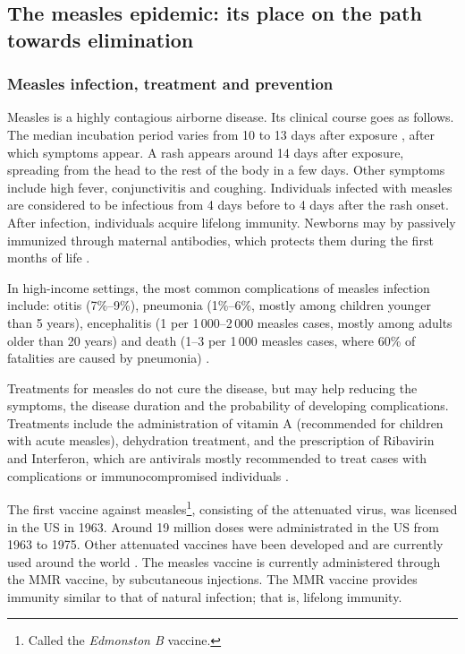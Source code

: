 \subsection{The measles epidemic: its place on the path towards elimination}
\subsubsection{Measles infection, treatment and prevention}
Measles is a highly contagious airborne disease. Its clinical course goes as follows. The median incubation period varies from 10 to 13 days after exposure \cite[]{CDC_Measles2015,Strebel2013}, after which symptoms appear. A rash appears around 14 days after exposure, spreading from the head to the rest of the body in a few days. Other symptoms include high fever, conjunctivitis and coughing. Individuals infected with measles are considered to be infectious from 4 days before to 4 days after the rash onset. After infection, individuals acquire lifelong immunity. Newborns may by passively immunized through maternal antibodies, which protects them during the first months of life \cite[]{Strebel2013}.

In high-income settings, the most common complications of measles infection include: otitis (7\%--9\%), pneumonia (1\%--6\%, mostly among children younger than 5 years), encephalitis (1 per 1\,000--2\,000 measles cases, mostly among adults older than 20 years) and death (1--3 per 1\,000 measles cases, where 60\% of fatalities are caused by pneumonia) \cite[]{Strebel2013}.

Treatments for measles do not cure the disease, but may help reducing the symptoms, the disease duration and the probability of developing complications. Treatments include the administration of vitamin A (recommended for children with acute measles), dehydration treatment, and the prescription of Ribavirin and Interferon, which are antivirals mostly recommended to treat cases with complications or immunocompromised individuals \cite[]{Strebel2013}.

The first vaccine against measles\footnote{Called the {\it Edmonston B} vaccine.}, consisting of the attenuated virus, was licensed in the US in 1963. Around 19 million doses were administrated in the US from 1963 to 1975. Other attenuated vaccines have been developed and are currently used around the world \cite[]{Strebel2013}. The measles vaccine is currently administered through the MMR vaccine, by subcutaneous injections. The MMR vaccine provides immunity similar to that of natural infection; that is, lifelong immunity. 

